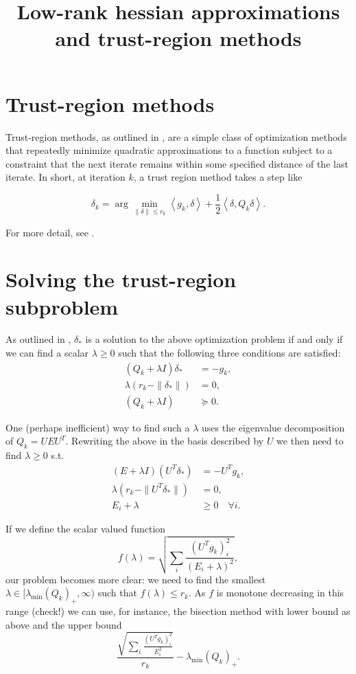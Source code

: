 \documentclass[10pt]{article}
\begin{document}
\title{Low-rank hessian approximations and trust-region methods} 
\author{}
\date{}
\maketitle

\section{Trust-region methods}
Trust-region methods, as outlined in \cite[p.66]{nw}, are a simple class of optimization methods that repeatedly minimize quadratic approximations to a function subject to a constraint that the next iterate remains within some specified distance of the last iterate. In short, at iteration $k$, a trust region method takes a step like 

$$\delta_{k} = \arg\min_{\|\delta\| \le r_k} \left<g_k,\delta \right> + \frac{1}{2}\left<\delta, Q_k\delta\right>.$$ 

For more detail, see \cite[p.66]{nw}.

\section{Solving the trust-region subproblem}
As outlined in \cite[Theorem 4.1]{nw}, $\delta_*$ is a solution to the above optimization problem if and only if we can find a scalar $\lambda \ge 0$ such that the following three conditions are satisfied:
\begin{align*}
(Q_k + \lambda I)\delta_* &= -g_k, \\
\lambda(r_k - \|\delta_* \|) &= 0, \\
(Q_k + \lambda I) &\succeq 0.
\end{align*}

One (perhaps inefficient) way to find such a $\lambda$ uses the eigenvalue decomposition of $Q_k = UEU^{T}$. Rewriting the above in the basis described by $U$ we then need to find $\lambda \ge 0$ s.t. 
\begin{align*}
(E + \lambda I)(U^T\delta_*) &= -U^Tg_k, \\
\lambda(r_k - \|U^T \delta_* \|) &= 0, \\
E_i + \lambda  &\ge 0 \quad \forall i.
\end{align*}

If we define the scalar valued function $$f(\lambda) = \sqrt{\sum_i \frac{(U^Tg_k)_i^2}{(E_i + \lambda)^2}},$$
our problem becomes more clear: we need to find the smallest $\lambda \in [\lambda_{\textrm{min}}(Q_k)_+, \infty)$ such that $f(\lambda) \le r_k$. As $f$ is monotone decreasing in this range (check!) we can use, for instance, the bisection method with lower bound as above and the upper bound $$\frac{\sqrt{\sum_i \frac{(U^Tg_k)_i^2}{E_i ^2}}}{r_k} - \lambda_{\textrm{min}}(Q_k)_+.$$
\end{document}
